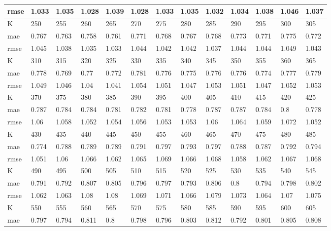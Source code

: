 \begin{appendices}
\begin{center}
\begin{tabularx}{\textwidth}{|l|X|X|X|X|X|X|X|X|X|X|X|X|}
		rmse & 1.033 & 1.035 & 1.028 & 1.039 & 1.028 & 1.033 & 1.035 & 1.032 & 1.034 & 1.038 & 1.046 & 1.037 \\ \hline 
		\hline 
		K & 250 & 255 & 260 & 265 & 270 & 275 & 280 & 285 & 290 & 295 & 300 & 305 \\ \hline 
		mae & 0.767 & 0.763 & 0.758 & 0.761 & 0.771 & 0.768 & 0.767 & 0.768 & 0.773 & 0.771 & 0.775 & 0.772 \\ \hline 
		rmse & 1.045 & 1.038 & 1.035 & 1.033 & 1.044 & 1.042 & 1.042 & 1.037 & 1.044 & 1.044 & 1.049 & 1.043 \\ \hline 
		\hline 
		K & 310 & 315 & 320 & 325 & 330 & 335 & 340 & 345 & 350 & 355 & 360 & 365 \\ \hline 
		mae & 0.778 & 0.769 & 0.77 & 0.772 & 0.781 & 0.776 & 0.775 & 0.776 & 0.776 & 0.774 & 0.777 & 0.779 \\ \hline 
		rmse & 1.049 & 1.046 & 1.04 & 1.041 & 1.054 & 1.051 & 1.047 & 1.053 & 1.051 & 1.047 & 1.052 & 1.053 \\ \hline 
		\hline 
		K & 370 & 375 & 380 & 385 & 390 & 395 & 400 & 405 & 410 & 415 & 420 & 425 \\ \hline 
		mae & 0.787 & 0.784 & 0.784 & 0.781 & 0.782 & 0.781 & 0.778 & 0.787 & 0.787 & 0.784 & 0.8 & 0.778 \\ \hline 
		rmse & 1.06 & 1.058 & 1.052 & 1.054 & 1.056 & 1.053 & 1.053 & 1.06 & 1.064 & 1.059 & 1.072 & 1.052 \\ \hline 
		\hline 
		K & 430 & 435 & 440 & 445 & 450 & 455 & 460 & 465 & 470 & 475 & 480 & 485 \\ \hline 
		mae & 0.774 & 0.788 & 0.789 & 0.789 & 0.791 & 0.797 & 0.793 & 0.797 & 0.788 & 0.787 & 0.792 & 0.794 \\ \hline 
		rmse & 1.051 & 1.06 & 1.066 & 1.062 & 1.065 & 1.069 & 1.066 & 1.068 & 1.058 & 1.062 & 1.067 & 1.068 \\ \hline 
		\hline 
		K & 490 & 495 & 500 & 505 & 510 & 515 & 520 & 525 & 530 & 535 & 540 & 545 \\ \hline 
		mae & 0.791 & 0.792 & 0.807 & 0.805 & 0.796 & 0.797 & 0.793 & 0.806 & 0.8 & 0.794 & 0.798 & 0.802 \\ \hline 
		rmse & 1.062 & 1.063 & 1.08 & 1.08 & 1.069 & 1.071 & 1.066 & 1.079 & 1.073 & 1.064 & 1.07 & 1.075 \\ \hline 
		\hline 
		K & 550 & 555 & 560 & 565 & 570 & 575 & 580 & 585 & 590 & 595 & 600 & 605 \\ \hline 
		mae & 0.797 & 0.794 & 0.811 & 0.8 & 0.798 & 0.796 & 0.803 & 0.812 & 0.792 & 0.801 & 0.805 & 0.808 \\ \hline 

\end{tabularx}
\end{center}
\end{appendices}
